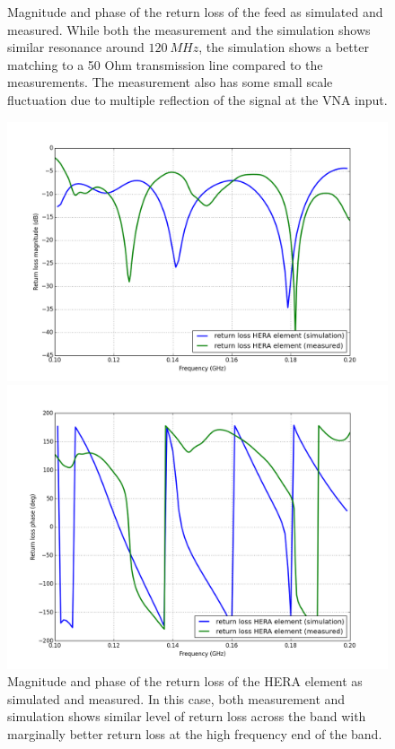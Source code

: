 \documentclass[twocolumn]{emulateapj}
\begin{document}
\begin{itemize}
\begin{figure}[ht]
\begin{minipage}[b]{\linewidth}
\end{minipage}
\caption{Magnitude and phase of the return loss of the feed as simulated and measured. While both the measurement and the simulation shows similar resonance around $120~MHz$, the simulation shows a better matching to a 50 Ohm transmission line compared to the measurements. The measurement also has some small scale fluctuation due to multiple reflection of the signal at the VNA input. }   
\label{meas_sim_RL_feed}
\end{figure}



\begin{figure}[ht]
\begin{minipage}[b]{\linewidth}
\centering
\includegraphics[angle=0, width=\linewidth]{plots/HERA_meas_sim_mag.png}
\end{minipage}
\vspace{0.1cm}
\begin{minipage}[b]{\linewidth}
\centering
\includegraphics[angle=0, width=\linewidth]{plots/HERA_meas_sim_ph.png}
\end{minipage}
\caption{Magnitude and phase of the return loss of the HERA element as simulated and measured. In this case, both measurement and simulation shows similar level of return loss across the band with marginally better return loss at the high frequency end of the band. }   
\label{meas_sim_RL_HERA}
\end{figure}


\end{itemize}
\end{document}
